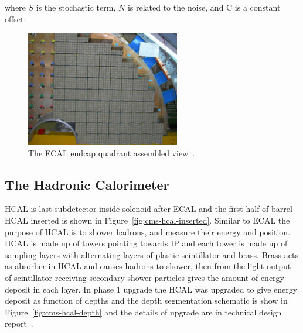 where \(S \) is the stochastic term, \(N \) is related to the noise,
and C is a constant offset.

\begin{figure}[!ht]
  \centering
  \includegraphics[width=0.60\textwidth]{figures/cms_ecal_ee_quadrant.jpg}
  \caption[The \gls{ECAL} endcap quadrant assembled view]%
  {The \gls{ECAL} endcap quadrant assembled view~\cite{image-cms-ecal-ee-quadrant}.}%
  \label{fig:cms-ecal-ee}
\end{figure}

\subsection{
  The Hadronic Calorimeter
}

\gls{HCAL} is last subdetector inside solenoid after
\gls{ECAL} and the first half of barrel \gls{HCAL} inserted is shown in
Figure~\ref{fig:cms-hcal-inserted}. Similar to \gls{ECAL} the purpose of \gls{HCAL}
is to shower hadrons, and measure their energy and position. \gls{HCAL} is made up of
towers pointing towards \gls{IP} and each tower is made up of sampling layers
with alternating layers of plastic scintillator and brass.
Brass acts as absorber in \gls{HCAL} and causes hadrons to shower, then from the light
output of scintillator receiving secondary shower particles gives the amount of
energy deposit in each layer. In phase 1 upgrade the \gls{HCAL} was upgraded
to give energy deposit as function of depths and the depth segmentation schematic is
show in Figure~\ref{fig:cms-hcal-depth} and the details of upgrade are in technical design
report~\cite{cms-hcal-upgrade}.


